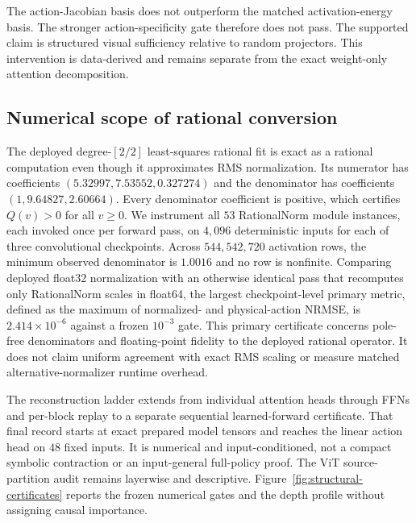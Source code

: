 \documentclass{article}
\begin{document}
The action-Jacobian basis does not outperform the matched activation-energy basis. The stronger
action-specificity gate therefore does not pass. The supported claim is structured visual
sufficiency relative to random projectors. This intervention is data-derived and remains separate
from the exact weight-only attention decomposition.

\clearpage
\subsection{Numerical scope of rational conversion}
\label{app:rational-scope}

The deployed degree-$[2/2]$ least-squares rational fit is exact as a rational computation even
though it approximates RMS normalization. Its numerator has coefficients
$(5.32997,7.53552,0.327274)$ and the denominator has coefficients
$(1,9.64827,2.60664)$. Every denominator coefficient is positive, which certifies $Q(v)>0$ for
all $v\geq0$. We instrument all $53$ RationalNorm module instances, each invoked once per forward
pass, on $4{,}096$ deterministic inputs for each of three convolutional checkpoints.
Across $544{,}542{,}720$ activation rows, the minimum observed denominator is $1.0016$ and no row
is nonfinite. Comparing deployed float32 normalization with an otherwise identical pass that
recomputes only RationalNorm scales in float64, the largest checkpoint-level primary metric,
defined as the maximum of normalized- and physical-action NRMSE, is
$2.414\times10^{-6}$ against a frozen $10^{-3}$ gate.
This primary certificate concerns pole-free denominators and floating-point fidelity to the
deployed rational operator. It does not claim uniform agreement with exact RMS scaling or measure
matched alternative-normalizer runtime overhead.

The reconstruction ladder extends from individual attention heads through FFNs and per-block
replay to a separate sequential learned-forward certificate. That final record starts at exact
prepared model tensors and reaches the linear action head on $48$ fixed inputs. It is numerical and
input-conditioned, not a compact symbolic contraction or an input-general full-policy proof. The
ViT source-partition audit remains layerwise and descriptive. Figure~\ref{fig:structural-certificates}
reports the frozen numerical gates and the depth profile without assigning causal importance.
\end{document}
